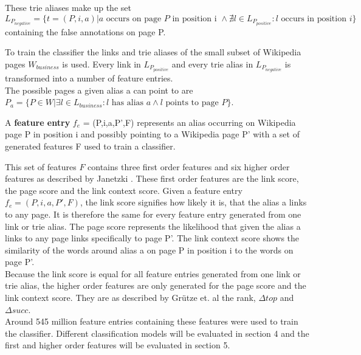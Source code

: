 These trie aliases make up the set $L_{P_{negative}} = \{ t = (P,i,a) | a \text{ occurs on page } P \text{ in position i } \land \nexists l \in L_{P_{positive}}: l \text{ occurs in position } i \}$ containing the false annotations on page P.\par
To train the classifier the links and trie aliases of the small subset of Wikipedia pages $W_{business}$ is used. Every link in $L_{P_{positive}}$ and every trie alias in $L_{P_{negative}}$ is transformed into a number of feature entries.\\
The possible pages a given alias a can point to are $P_a = \{ P \in W | \exists l \in L_{business}: l \text{ has alias } a \land l \text{ points to page } P \}$.
\begin{definition}
A \textbf{feature entry} $f_e$ = (P,i,a,P',F) represents an alias occurring on Wikipedia page P in position i and possibly pointing to a Wikipedia page P' with a set of generated features F used to train a classifier.
\end{definition}
This set of features $F$ contains three first order features and six higher order features as described by Janetzki \cite{janetzki}. These first order features are the link score, the page score and the link context score. Given a feature entry $f_e = (P,i,a,P',F)$, the link score signifies how likely it is, that the alias a links to any page. It is therefore the same for every feature entry generated from one link or trie alias. The page score represents the likelihood that given the alias a links to any page links specifically to page P'. The link context score shows the similarity of the words around alias a on page P in position i to the words on page P'.\\
Because the link score is equal for all feature entries generated from one link or trie alias, the higher order features are only generated for the page score and the link context score. They are as described by Grütze et. al \cite{coheel} the rank, $\Delta top$ and $\Delta succ$.\\
Around 545 million feature entries containing these features were used to train the classifier. Different classification models will be evaluated in section 4 and the first and higher order features will be evaluated in section 5.

